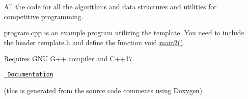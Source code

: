All the code for all the algorithms and data structures and utilities for competitive programming.

\mbox{\hyperlink{program_8cpp}{program.\+cpp}} is an example program utilizing the template. You need to include the header template.\+h and define the function void \mbox{\hyperlink{d_8cpp_af095a232149097b5605064623a9345ac}{main2()}}.

Requires G\+NU G++ compiler and C++17.

\href{https://ramchandraapte.github.io/OmniTemplate/}{\texttt{ Documentation}}

(this is generated from the source code comments using Doxygen) 